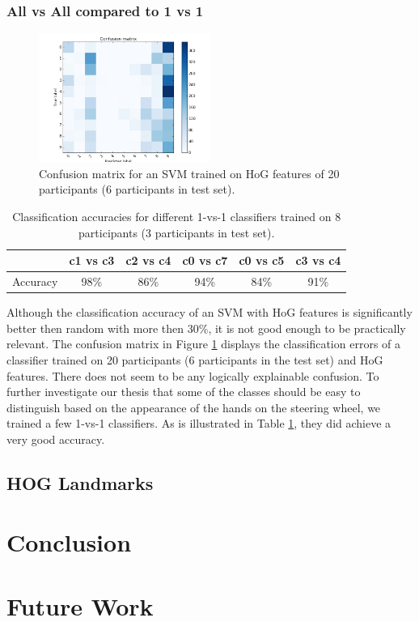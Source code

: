 \documentclass[10pt,twocolumn,letterpaper]{article}
\begin{document}
	\subsubsection{All vs All compared to 1 vs 1}
	\begin{figure}[h]
		\centering
		\includegraphics[width=0.5\textwidth]{handpose_plot_20p_c9}
		\caption{Confusion matrix for an SVM trained on HoG features of 20 participants (6 participants in test set).}
		\label{hand_estimation_cm}
	\end{figure}
	\begin{table}
		\begin{tabular}{c|c|c|c|c|c}
			& c1 vs c3 & c2 vs c4 & c0 vs c7 & c0 vs c5 & c3 vs c4 \\ 
			\hline 
			Accuracy & 98\% & 86\% & 94\% & 84\% & 91\% \\ 
		\end{tabular} 
		\caption{Classification accuracies for different 1-vs-1 classifiers trained on 8 participants (3 participants in test set).}
		\label{hand_estimation_1vs1}
	\end{table}
	Although the classification accuracy of an SVM with HoG features is significantly better then random with more then 30\%, it is not good enough to be practically relevant. The confusion matrix in Figure \ref{hand_estimation_cm} displays the classification errors of a classifier trained on 20 participants (6 participants in the test set) and HoG features. There does not seem to be any logically explainable confusion. To further investigate our thesis that some of the classes should be easy to distinguish based on the appearance of the hands on the steering wheel, we trained a few 1-vs-1 classifiers. As is illustrated in Table \ref{hand_estimation_1vs1}, they did achieve a very good accuracy. 
	
	
\subsection{HOG Landmarks}




\section{Conclusion}

\section{Future Work}




{\small


}
\end{document}
